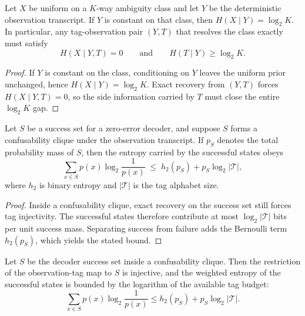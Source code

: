 \begin{theorem}\label{thm:conditional-entropy-converse}
Let $X$ be uniform on a $K$-way ambiguity class and let $Y$ be the deterministic observation transcript. If $Y$ is constant on that class, then $H(X\mid Y)=\log_2 K$. In particular, any tag-observation pair $(Y,T)$ that resolves the class exactly must satisfy
\[
H(X\mid Y,T)=0
\qquad\text{and}\qquad
H(T\mid Y)\ge \log_2 K .
\]
\end{theorem}

\begin{proof}
If $Y$ is constant on the class, conditioning on $Y$ leaves the uniform prior unchanged, hence $H(X\mid Y)=\log_2 K$. Exact recovery from $(Y,T)$ forces $H(X\mid Y,T)=0$, so the side information carried by $T$ must close the entire $\log_2 K$ gap.
\end{proof}

\begin{theorem}\label{thm:weighted-clique-entropy}
Let $S$ be a success set for a zero-error decoder, and suppose $S$ forms a confusability clique under the observation transcript. If $p_S$ denotes the total probability mass of $S$, then the entropy carried by the successful states obeys
\[
\sum_{x\in S} p(x)\log_2 \frac{1}{p(x)}
\;\le\;
h_2(p_S) + p_S \log_2 |\mathcal T|,
\]
where $h_2$ is binary entropy and $|\mathcal T|$ is the tag alphabet size.
\end{theorem}

\begin{proof}
Inside a confusability clique, exact recovery on the success set still forces tag injectivity. The successful states therefore contribute at most $\log_2 |\mathcal T|$ bits per unit success mass. Separating success from failure adds the Bernoulli term $h_2(p_S)$, which yields the stated bound.
\end{proof}

\begin{theorem}\label{thm:success-set-injective}
Let $S$ be the decoder success set inside a confusability clique. Then the restriction of the observation-tag map to $S$ is injective, and the weighted entropy of the successful states is bounded by the logarithm of the available tag budget:
\[
\sum_{x\in S} p(x)\log_2 \frac{1}{p(x)}
\le
h_2(p_S)+ p_S \log_2 |\mathcal T|.
\]
\end{theorem}

